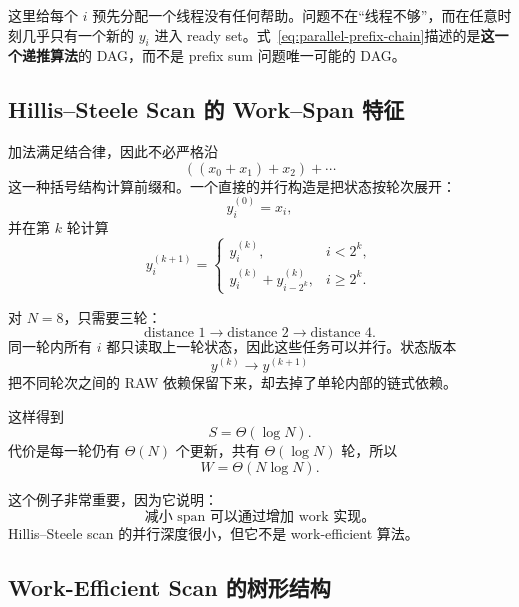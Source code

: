 这里给每个 $i$ 预先分配一个线程没有任何帮助。问题不在“线程不够”，而在任意时刻几乎只有一个新的 $y_i$ 进入 ready set。式~\eqref{eq:parallel-prefix-chain}描述的是\textbf{这一个递推算法}的 DAG，而不是 prefix sum 问题唯一可能的 DAG。

\subsection{Hillis--Steele Scan 的 Work--Span 特征}

加法满足结合律，因此不必严格沿
\begin{equation}
((x_0+x_1)+x_2)+\cdots
\end{equation}
这一种括号结构计算前缀和。一个直接的并行构造是把状态按轮次展开：
\begin{equation}
y_i^{(0)}=x_i,
\end{equation}
并在第 $k$ 轮计算
\begin{equation}
y_i^{(k+1)}
=
\begin{cases}
y_i^{(k)}, & i<2^k,\\[0.3em]
y_i^{(k)}+y_{i-2^k}^{(k)}, & i\ge 2^k.
\end{cases}
\label{eq:parallel-hillis-steele}
\end{equation}

对 $N=8$，只需要三轮：
\begin{equation}
\text{distance }1
\rightarrow
\text{distance }2
\rightarrow
\text{distance }4.
\end{equation}
同一轮内所有 $i$ 都只读取上一轮状态，因此这些任务可以并行。状态版本
\begin{equation}
y^{(k)}
\rightarrow
y^{(k+1)}
\end{equation}
把不同轮次之间的 RAW 依赖保留下来，却去掉了单轮内部的链式依赖。

这样得到
\begin{equation}
S=\Theta(\log N).
\end{equation}
代价是每一轮仍有 $\Theta(N)$ 个更新，共有 $\Theta(\log N)$ 轮，所以
\begin{equation}
W=\Theta(N\log N).
\end{equation}

这个例子非常重要，因为它说明：
\begin{equation}
\boxed{
\text{减小 span 可以通过增加 work 实现。}
}
\label{eq:parallel-work-span-tradeoff}
\end{equation}
Hillis--Steele scan 的并行深度很小，但它不是 work-efficient 算法。

\subsection{Work-Efficient Scan 的树形结构}

